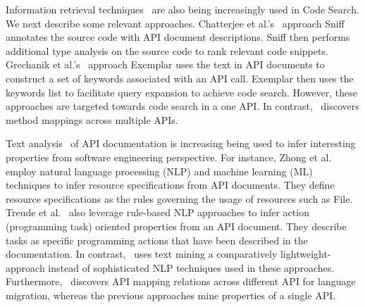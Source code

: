 

Information retrieval techniques~\cite{chatterjee2009sniff,grechanik2010search,kim2010towards,Reiss2009SCS} are also being increasingly used in Code Search. We next describe some relevant approaches.
Chatterjee et al.'s~\cite{chatterjee2009sniff} approach Sniff annotates the source code with API document descriptions. 
Sniff then performs additional type analysis on the source code to rank relevant code snippets. 
Grechanik et al.'s~\cite{grechanik2010search} approach Exemplar uses the text in API documents to construct a set of keywords associated with an API call.
Exemplar then uses the keywords list to facilitate query expansion to achieve code search.
However, these approaches are targeted towards code search in a one API.
In contrast, \tool\ discovers method mappings across multiple APIs. 


Text analysis~\cite{Dekel2009, pandita12:inferring,Zhou2008,Little2009, zhong09SE} of API documentation is increasing being used to infer interesting properties from software engineering perspective.
For instance, Zhong et al.~\cite{zhong09SE} employ natural language processing (NLP) and machine learning (ML) techniques to infer resource specifications from API documents.
They define resource specifications as the rules governing the usage of resources such as File.
Treude et al.~\cite{treudeextracting} also leverage rule-based NLP approaches to infer action (programming task) oriented properties from an API document. They describe tasks as specific programming actions that have been described in the documentation. 
In contrast, \tool\ uses text mining a comparatively lightweight-approach instead of sophisticated NLP techniques used in these approaches.
Furthermore, \tool\ discovers API mapping relations across different API for language migration, whereas the previous approaches mine properties of a single API.


